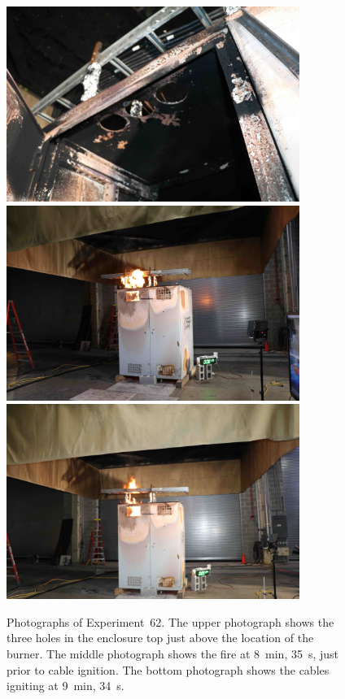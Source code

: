 \begin{figure}[p]
\centering
\includegraphics[height=2.50in]{../FIGURES/Test_62_cables} \\
\includegraphics[height=2.50in]{../FIGURES/Test_62_8_min_35_s} \\
\includegraphics[height=2.50in]{../FIGURES/Test_62_9_min_34_s}
\caption[Photographs of Experiment~62]{Photographs of Experiment~62. The upper photograph shows the three holes in the enclosure top just above the location of the burner. The middle photograph shows the fire at 8~min, 35~s, just prior to cable ignition. The bottom photograph shows the cables igniting at 9~min, 34~s.}
\label{fig:Test_62_photos}
\end{figure}


